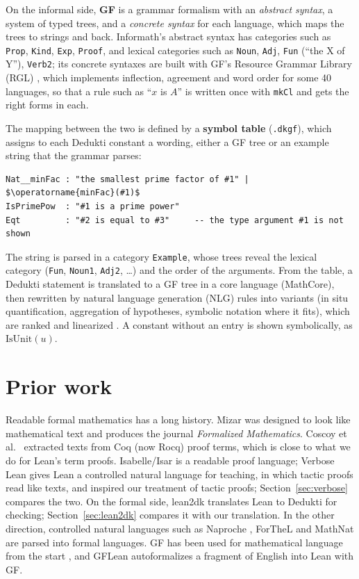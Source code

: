 \documentclass{easychair}
\newcommand{\ttt}[1]{\texttt{#1}}
\begin{document}
On the informal side, \textbf{GF} \cite{ranta-2004,ranta-2011} is a grammar formalism with an
\emph{abstract syntax}, a system of typed trees, and a \emph{concrete syntax} for each language,
which maps the trees to strings and back. Informath's abstract syntax has categories such as
\ttt{Prop}, \ttt{Kind}, \ttt{Exp}, \ttt{Proof}, and lexical categories such as \ttt{Noun},
\ttt{Adj}, \ttt{Fun} (``the X of Y''), \ttt{Verb2}; its concrete syntaxes are built with GF's
Resource Grammar Library (RGL) \cite{ranta-2009}, which implements inflection, agreement and
word order for some 40 languages, so that a rule such as ``$x$ is $A$'' is written once with
\ttt{mkCl} and gets the right forms in each.

The mapping between the two is defined by a \textbf{symbol table} (\ttt{.dkgf}), which assigns
to each Dedukti constant a wording, either a GF tree or an example string that the grammar
parses:
\begin{lstlisting}
Nat__minFac : "the smallest prime factor of #1" | $\operatorname{minFac}(#1)$
IsPrimePow  : "#1 is a prime power"
Eqt         : "#2 is equal to #3"     -- the type argument #1 is not shown
\end{lstlisting}
The string is parsed in a category \ttt{Example}, whose trees reveal the lexical category
(\ttt{Fun}, \ttt{Noun1}, \ttt{Adj2}, \ldots) and the order of the arguments. From the table,
a Dedukti statement is translated to a GF tree in a core language (MathCore), then rewritten by
natural language generation (NLG) rules into variants (in situ quantification, aggregation of
hypotheses, symbolic notation where it fits), which are ranked and linearized
\cite{ranta-2024}. A constant without an entry is shown symbolically, as
$\mathrm{IsUnit}(u)$.

\section{Prior work}

Readable formal mathematics has a long history. Mizar \cite{bancerek-al-2015} was designed to
look like mathematical text and produces the journal \emph{Formalized Mathematics}. Coscoy et
al.\ \cite{coscoy-al-1995} extracted texts from Coq (now Rocq) proof terms, which is close to
what we do for Lean's term proofs. Isabelle/Isar \cite{wenzel-1999} is a readable proof
language; Verbose Lean \cite{massot-2024} gives Lean a controlled natural language for
teaching, in which tactic proofs read like texts, and inspired our treatment of tactic proofs;
Section~\ref{sec:verbose} compares the two.
On the formal side, lean2dk \cite{lean2dk,vaishnav-2026} translates Lean to Dedukti for
checking; Section~\ref{sec:lean2dk} compares it with our translation.
In the other direction, controlled natural languages such as Naproche \cite{cramer-al-2009,
koepke-2025}, ForTheL \cite{paskevich-2007} and MathNat \cite{humayoun-raffalli-2010} are
parsed into formal languages. GF has been used for mathematical language from the start
\cite{hallgren-ranta-2000,ranta-2011c,kelber-al-2025}, and GFLean \cite{pathak-2024}
autoformalizes a fragment of English into Lean with GF.
\end{document}
